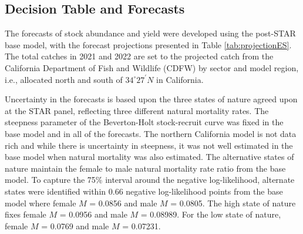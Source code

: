 \documentclass[11pt,
  english,
]{article}
\begin{document}
\FloatBarrier


\hypertarget{decision-table-and-forecasts}{%
\subsection*{Decision Table and Forecasts}\label{decision-table-and-forecasts}}

\leavevmode\tagmcend\tagstructend

The forecasts of stock abundance and yield were developed using the post-STAR base model, with the forecast projections presented in Table \ref{tab:projectionES}. The total catches in 2021 and 2022 are set to the projected catch from the California Department of Fish and Wildlife (CDFW) by sector and model region, i.e., allocated north and south of $34^\circ 27^\prime N$ in California.

Uncertainty in the forecasts is based upon the three states of nature agreed upon at the STAR panel, reflecting three different natural mortality rates. The steepness parameter of the Beverton-Holt stock-recruit curve was fixed in the base model and in all of the forecasts. The northern California model is not data rich and while there is uncertainty in steepness, it was not well estimated in the base model when natural mortality was also estimated. The alternative states of nature maintain the female to male natural mortality rate ratio from the base model. To capture the 75\% interval around the negative log-likelihood, alternate states were identified within 0.66 negative log-likelihood points from the base model where female {\(M\)\leavevmode\tagmcend\tagstructend} = 0.0856 and male {\(M\)\leavevmode\tagmcend\tagstructend} = 0.0805. The high state of nature fixes female {\(M\)\leavevmode\tagmcend\tagstructend} = 0.0956 and male {\(M\)\leavevmode\tagmcend\tagstructend} = 0.08989. For the low state of nature, female {\(M\)\leavevmode\tagmcend\tagstructend} = 0.0769 and male {\(M\)\leavevmode\tagmcend\tagstructend} = 0.07231.
\end{document}
